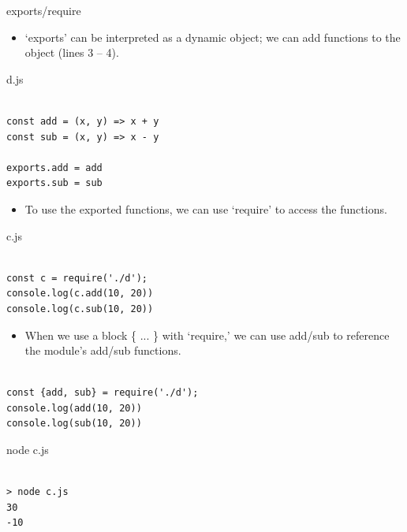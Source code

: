 \begin{frame}[fragile]{exports/require}

\begin{itemize}
	\item `exports' can be interpreted as a dynamic object; we can add functions to the object (lines 3 -- 4). 
\end{itemize}

\begin{Code}{d.js}%
\begin{lstlisting}[firstnumber=1, label=glabels, xleftmargin=0pt, basicstyle=\scriptsize]% 

const add = (x, y) => x + y
const sub = (x, y) => x - y

exports.add = add
exports.sub = sub
\end{lstlisting}%
\end{Code}%

\begin{itemize}
	\item To use the exported functions, we can use `require' to access the functions. 
\end{itemize}

\begin{Code}{c.js}%
\begin{lstlisting}[firstnumber=1, label=glabels, xleftmargin=0pt, basicstyle=\scriptsize]% 

const c = require('./d');
console.log(c.add(10, 20))
console.log(c.sub(10, 20))
\end{lstlisting}%
\end{Code}%
\end{frame}

\begin{frame}[fragile]{}

\begin{itemize}
	\item When we use a block \{ ... \} with  `require,' we can use add/sub to reference the module's add/sub functions. 
\end{itemize}

\begin{Code}{}%
\begin{lstlisting}[firstnumber=1, label=glabels, xleftmargin=0pt, basicstyle=\scriptsize]% 

const {add, sub} = require('./d');
console.log(add(10, 20))
console.log(sub(10, 20))
\end{lstlisting}%
\end{Code}%

\begin{Command}{node c.js}%
\begin{lstlisting}[firstnumber=1, label=glabels, xleftmargin=0pt, basicstyle=\scriptsize]% 

> node c.js
30
-10
\end{lstlisting}%
\end{Command}%

\end{frame}